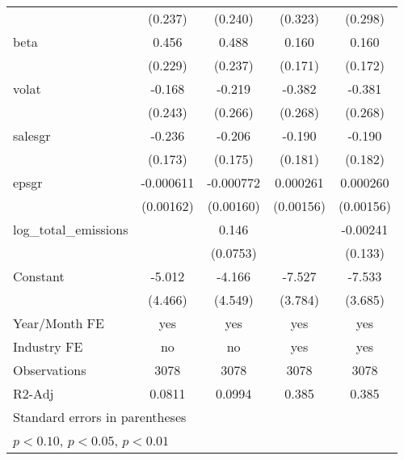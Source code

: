 \begin{table}[htbp]
\begin{tabular}{l*{4}{c}}
                    &     (0.237)         &     (0.240)         &     (0.323)         &     (0.298)         \\
[1em]
beta                &       0.456\sym{*}  &       0.488\sym{**} &       0.160         &       0.160         \\
                    &     (0.229)         &     (0.237)         &     (0.171)         &     (0.172)         \\
[1em]
volat               &      -0.168         &      -0.219         &      -0.382         &      -0.381         \\
                    &     (0.243)         &     (0.266)         &     (0.268)         &     (0.268)         \\
[1em]
salesgr             &      -0.236         &      -0.206         &      -0.190         &      -0.190         \\
                    &     (0.173)         &     (0.175)         &     (0.181)         &     (0.182)         \\
[1em]
epsgr               &   -0.000611         &   -0.000772         &    0.000261         &    0.000260         \\
                    &   (0.00162)         &   (0.00160)         &   (0.00156)         &   (0.00156)         \\
[1em]
log\_total\_emissions &                     &       0.146\sym{*}  &                     &    -0.00241         \\
                    &                     &    (0.0753)         &                     &     (0.133)         \\
[1em]
Constant            &      -5.012         &      -4.166         &      -7.527\sym{*}  &      -7.533\sym{**} \\
                    &     (4.466)         &     (4.549)         &     (3.784)         &     (3.685)         \\
\hline
Year/Month FE       &         yes         &         yes         &         yes         &         yes         \\
Industry FE         &          no         &          no         &         yes         &         yes         \\
Observations        &        3078         &        3078         &        3078         &        3078         \\
R2-Adj              &      0.0811         &      0.0994         &       0.385         &       0.385         \\
\hline\hline
\multicolumn{5}{l}{\footnotesize Standard errors in parentheses}\\
\multicolumn{5}{l}{\footnotesize \sym{*} \(p<0.10\), \sym{**} \(p<0.05\), \sym{***} \(p<0.01\)}\\
\end{tabular}
\end{table}
